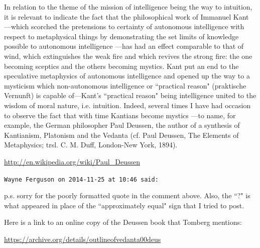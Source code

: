 \begin{footnotesize}
\begin{sffamily}
\begin{quotex}
In relation to the theme of the mission of intelligence being the way to intuition, it is relevant to indicate the fact that the philosophical work of Immanuel Kant —which scorched the pretensions to certainty of autonomous intelligence with respect to metaphysical things by demonstrating the set limits of knowledge possible to autonomous intelligence —has had an effect comparable to that of wind, which extinguishes the weak fire and which revives the strong fire: the one becoming sceptics and the others becoming mystics. Kant put an end to the speculative metaphysics of autonomous intelligence and opened up the way to a mysticism which non-autonomous intelligence or ``practical reason" (praktische Vernunft) is capable of—Kant's ``practical reason" being intelligence united to the wisdom of moral nature, i.e. intuition. Indeed, several times I have had occasion to observe the fact that with time Kantians become mystics —to name, for example, the German philosopher Paul Deussen, the author of a synthesis of Kantianism, Platonism and the Vedanta (cf. Paul Deussen, The Elements of Metaphysics; trsl. C. M. Duff, London-New York, 1894).

\end{quotex}

\url{http://en.wikipedia.org/wiki/Paul\_Deussen}


\hfill

\texttt{Wayne Ferguson on 2014-11-25 at 10:46 said: }

p.s. sorry for the poorly formatted quote in the comment above. Also, the ``?" is what appeared in place of the ``approximately equal" sign that I tried to post. 

Here is a link to an online copy of the Deussen book that Tomberg mentions:

\url{https://archive.org/details/outlineofvedanta00deus}


\hfill


\end{sffamily}\end{footnotesize}
